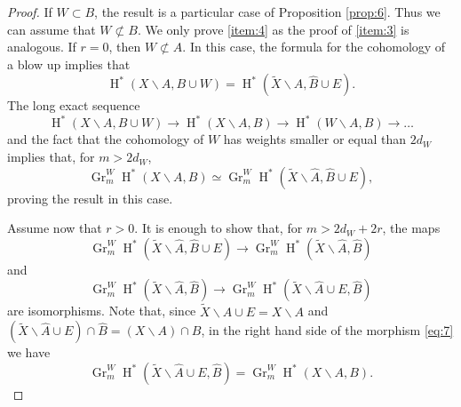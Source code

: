 \documentclass[11pt,a4paper]{amsart}
\DeclareMathOperator {\Gr} {Gr}
\DeclareMathOperator{\rH}{H}
\numberwithin{equation}{section}
\theoremstyle{plain}
\theoremstyle{definition}
\begin{document}
 \begin{proof} If $W\subset B$, the result is a particular case of
   Proposition \ref{prop:6}. Thus we can assume that $W\not \subset B$.
   We only prove \ref{item:4} as the proof of \ref{item:3} is
   analogous. If $r=0$, then $W\not \subset A$.  In this case, the formula for
   the cohomology of a blow up 
   implies  that
   \begin{equation}\label{eq:9}
     \rH^{\ast}(X\smallsetminus A,B\cup W) =
     \rH^{\ast}(\widetilde X\smallsetminus \widehat A,\widehat B\cup E).
   \end{equation}
   The long exact sequence
   \begin{displaymath}
     \rH^{\ast}(X\smallsetminus A,B\cup W) \longrightarrow
     \rH^{\ast}(X\smallsetminus A,B)\longrightarrow 
     \rH^{\ast}(W\smallsetminus A,B) \longrightarrow \dots
   \end{displaymath}
   and the fact that the cohomology of $W$ has weights smaller or
   equal than $2d_{W}$
 implies that, for $m>2d_{W}$,
 \begin{displaymath}
           \Gr^{W}_{m}\rH^{\ast}(X\smallsetminus A,B)
           \simeq
       \Gr^{W}_{m}\rH^{\ast}(\widetilde X\smallsetminus \widehat A,
        \widehat B\cup E),
 \end{displaymath}
proving the result in this case. 

   Assume now that $r>0$. It is enough to show that, for $m>2d_{W}+2r$, the maps
   \begin{equation}
     \label{eq:6}
     \Gr_{m}^{W}\rH^{\ast}(\widetilde X\smallsetminus \widehat A,
        \widehat B\cup E)\longrightarrow 
       \Gr_{m}^{W}\rH^{\ast}(\widetilde X\smallsetminus \widehat A,
        \widehat B)
   \end{equation}
   and
   \begin{equation}
     \label{eq:7}
     \Gr_{m}^{W}\rH^{\ast}(\widetilde X\smallsetminus \widehat A,
        \widehat B)\longrightarrow 
       \Gr_{m}^{W}\rH^{\ast}(\widetilde X\smallsetminus \widehat A\cup
      E,\widehat B)
   \end{equation}
   are isomorphisms. Note that, since $\widetilde X\smallsetminus
   \widehat A\cup E=X\smallsetminus A$ and $(\widetilde X\smallsetminus
   \widehat A\cup E)\cap \widehat B=(X\smallsetminus A)\cap B$, in the
   right hand side of the morphism \eqref{eq:7} we have
   \begin{displaymath}
     \Gr_{m}^{W}\rH^{\ast}(\widetilde X\smallsetminus \widehat A\cup
      E,\widehat B)=\Gr_{m}^{W}\rH^{\ast}(X\smallsetminus A,B).
   \end{displaymath}



\end{proof}
\end{document}
